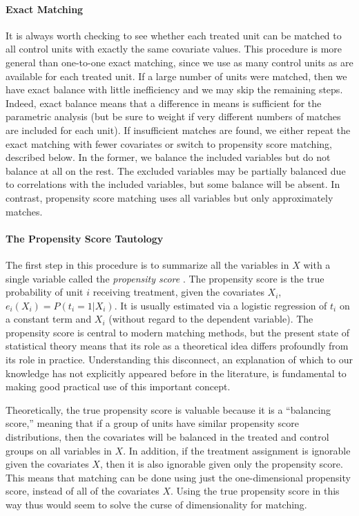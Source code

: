 \documentclass[11pt,titlepage]{article}
\begin{document}
\paragraph{Exact Matching}  
It is always worth checking to see whether each treated unit can be
matched to all control units with exactly the same covariate values.
This procedure is more general than one-to-one exact matching, since
we use as many control units as are available for each treated unit.
If a large number of units were matched, then we have exact balance
with little inefficiency and we may skip the remaining steps.  Indeed,
exact balance means that a difference in means is sufficient for the
parametric analysis (but be sure to weight if very different numbers
of matches are included for each unit).  If insufficient matches are
found, we either repeat the exact matching with fewer covariates or
switch to propensity score matching, described below.  In the former,
we balance the included variables but do not balance at all on the
rest.  The excluded variables may be partially balanced due to
correlations with the included variables, but some balance will be
absent.  In contrast, propensity score matching uses all variables but
only approximately matches.

\paragraph{The Propensity Score Tautology}
The first step in this procedure is to summarize all the variables in
$X$ with a single variable called the \emph{propensity score}
\citep{RosRub83}.  The propensity score is the true probability of
unit $i$ receiving treatment, given the covariates $X_i$, $e_i(X_i) =
P(t_i=1 | X_i)$.  It is usually estimated via a logistic regression of
$t_i$ on a constant term and $X_i$ (without regard to the dependent
variable).  The propensity score is central to modern matching
methods, but the present state of statistical theory means that its
role as a theoretical idea differs profoundly from its role in
practice.  Understanding this disconnect, an explanation of which to
our knowledge has not explicitly appeared before in the literature, is
fundamental to making good practical use of this important concept.

Theoretically, the true propensity score is valuable because it is a
``balancing score,'' meaning that if a group of units have similar
propensity score distributions, then the covariates will be balanced
in the treated and control groups on all variables in $X$.  In
addition, if the treatment assignment is ignorable given the
covariates $X$, then it is also ignorable given only the propensity
score.  This means that matching can be done using just the
one-dimensional propensity score, instead of all of the covariates
$X$.  Using the true propensity score in this way thus would seem to
solve the curse of dimensionality for matching.
\end{document}
